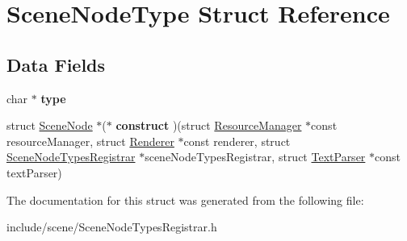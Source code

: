 \hypertarget{struct_scene_node_type}{}\section{Scene\+Node\+Type Struct Reference}
\label{struct_scene_node_type}
\subsection*{Data Fields}
\begin{DoxyCompactItemize}
\item 
\hypertarget{struct_scene_node_type_a23506fc4821ab6d9671f3e6222591a96}{}\label{struct_scene_node_type_a23506fc4821ab6d9671f3e6222591a96} 
char $\ast$ {\bfseries type}
\item 
\hypertarget{struct_scene_node_type_a73c6b5f5faad9469791b4d28ad90495b}{}\label{struct_scene_node_type_a73c6b5f5faad9469791b4d28ad90495b} 
struct \hyperlink{struct_scene_node}{Scene\+Node} $\ast$($\ast$ {\bfseries construct} )(struct \hyperlink{struct_resource_manager}{Resource\+Manager} $\ast$const resource\+Manager, struct \hyperlink{struct_renderer}{Renderer} $\ast$const renderer, struct \hyperlink{struct_scene_node_types_registrar}{Scene\+Node\+Types\+Registrar} $\ast$scene\+Node\+Types\+Registrar, struct \hyperlink{struct_text_parser}{Text\+Parser} $\ast$const text\+Parser)
\end{DoxyCompactItemize}


The documentation for this struct was generated from the following file\+:\begin{DoxyCompactItemize}
\item 
include/scene/Scene\+Node\+Types\+Registrar.\+h\end{DoxyCompactItemize}
